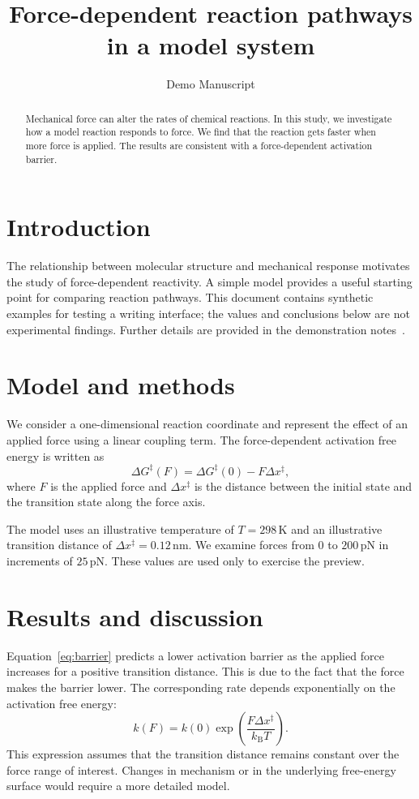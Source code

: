 \documentclass[11pt]{article}
\title{Force-dependent reaction pathways\\in a model system}
\author{Demo Manuscript}
\date{}
\begin{document}
\maketitle

\begin{abstract}
Mechanical force can alter the rates of chemical reactions.
In this study, we investigate how a model reaction responds to force.
We find that the reaction gets faster when more force is applied.
The results are consistent with a force-dependent activation barrier.
\end{abstract}

\section{Introduction}
The relationship between molecular structure and mechanical response
motivates the study of force-dependent reactivity. A simple model
provides a useful starting point for comparing reaction pathways.
This document contains synthetic examples for testing a writing interface;
the values and conclusions below are not experimental findings.
Further details are provided in the demonstration notes~\citep{demo}.

\section{Model and methods}
We consider a one-dimensional reaction coordinate and represent the
effect of an applied force using a linear coupling term. The
force-dependent activation free energy is written as
\begin{equation}
  \Delta G^{\ddagger}(F) = \Delta G^{\ddagger}(0) - F\Delta x^{\ddagger},
  \label{eq:barrier}
\end{equation}
where $F$ is the applied force and $\Delta x^{\ddagger}$ is the distance
between the initial state and the transition state along the force axis.

The model uses an illustrative temperature of $T = 298\,\mathrm{K}$ and
an illustrative transition distance of $\Delta x^{\ddagger} = 0.12\,\mathrm{nm}$.
We examine forces from $0$ to $200\,\mathrm{pN}$ in increments of
$25\,\mathrm{pN}$. These values are used only to exercise the preview.

\section{Results and discussion}
Equation~\ref{eq:barrier} predicts a lower activation barrier as the applied
force increases for a positive transition distance.
This is due to the fact that the force makes the barrier lower.
The corresponding rate depends exponentially on the activation free energy:
\begin{equation}
  k(F) = k(0)\exp\!\left(\frac{F\Delta x^{\ddagger}}{k_{\mathrm{B}}T}\right).
  \label{eq:rate}
\end{equation}
This expression assumes that the transition distance remains constant
over the force range of interest. Changes in mechanism or in the
underlying free-energy surface would require a more detailed model.
\end{document}
